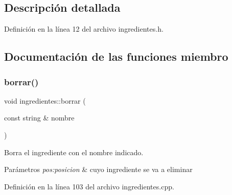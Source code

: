 \subsection{Descripción detallada}


Definición en la línea 12 del archivo ingredientes.\+h.



\subsection{Documentación de las funciones miembro}
\mbox{\label{classingredientes_a8d8d637d74d3cfb1382cf4f0646a6fb8}} 
\subsubsection{\texorpdfstring{borrar()}{borrar()}}
{\footnotesize\ttfamily void ingredientes\+::borrar (\begin{DoxyParamCaption}\item[{const string \&}]{nombre }\end{DoxyParamCaption})}



Borra el ingrediente con el nombre indicado. 


\begin{DoxyParams}{Parámetros}
{\em pos\+:posicion} & cuyo ingrediente se va a eliminar \\
\hline
\end{DoxyParams}


Definición en la línea 103 del archivo ingredientes.\+cpp.



